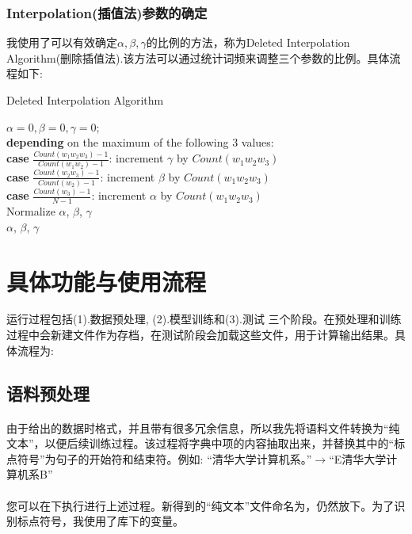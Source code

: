 \documentclass[UTF8, onecolumn, a4paper]{article}
\begin{document}
\subsubsection{Interpolation(插值法)参数的确定}
我使用了可以有效确定$\alpha, \beta, \gamma$的比例的方法，称为Deleted Interpolation Algorithm(删除插值法).该方法可以通过统计词频来调整三个参数的比例。具体流程如下:\\
\begin{algorithm}[H]
	\caption{Deleted Interpolation Algorithm}%
	\KwOut{$\alpha$, $\beta$, $\gamma$;}%
	$\alpha = 0, \beta = 0, \gamma = 0$;\\ %
	 {
		\textbf{depending} on the maximum of the following 3 values:\\
		\textbf{case} $\frac{Count(w_1w_2w_3)-1}{Count(w_1w_2)-1}$: increment $\gamma$ by $Count(w_1w_2w_3)$\\
		\textbf{case} $\frac{Count(w_2w_3)-1}{Count(w_2)-1}$:      increment $\beta$ by $Count(w_1w_2w_3)$\\
		\textbf{case} $\frac{Count(w_3)-1}{N - 1}$:                increment $\alpha$ by $Count(w_1w_2w_3)$\\
	}
	Normalize $\alpha$, $\beta$, $\gamma$\\
	\Return $\alpha$, $\beta$, $\gamma$
\end{algorithm}

\section{具体功能与使用流程}
运行过程包括(1).数据预处理, (2).模型训练和(3).测试 三个阶段。在预处理和训练过程中会新建文件作为存档，在测试阶段会加载这些文件，用于计算输出结果。具体流程为:
\subsection{语料预处理}
\paragraph*{}
由于给出的数据时格式，并且带有很多冗余信息，所以我先将语料文件转换为“纯文本”，以便后续训练过程。该过程将字典中项的内容抽取出来，并替换其中的“标点符号”为句子的开始符和结束符。例如:
“清华大学计算机系。”$\rightarrow$“E清华大学计算机系B”
\paragraph*{}
您可以在下执行进行上述过程。新得到的“纯文本”文件命名为，仍然放下。为了识别标点符号，我使用了库下的变量。
\end{document}
